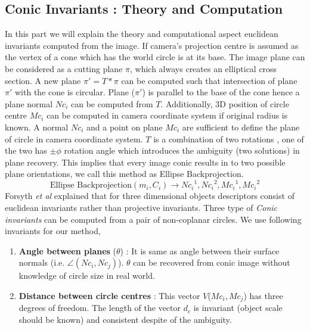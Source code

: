 \documentclass{bmvc2k}
\def\etal{\emph{et al}\bmvaOneDot}
\begin{document}
\subsection{Conic Invariants : Theory and Computation}
\label{subSec:ConicInv}
In this part we will explain the theory and computational aspect euclidean invariants computed from the image.  
If camera's projection centre is assumed as the vertex of a cone which has the world circle is at its base.
The image plane can be considered as a cutting plane $\pi$, which always creates an elliptical cross section.  
A new plane $ \pi' = T* \pi $ can be computed such that intersection of plane $\pi'$ with the cone is circular. 
Plane ($\pi'$) is parallel to the base of the cone hence a plane normal $Nc_i$ can be computed from $T$. 
Additionally, 3D position of circle centre $Mc_i$ can be computed in camera coordinate system if original radius is known.
A normal $Nc_i$ and a point on plane $Mc_i$ are sufficient to define the plane of circle in camera coordinate system.
$ T $ is a combination of two rotations \cite{forsyth_91}\cite{lo_pez_de_ipin_a_trip:_2002}, one of the two has $\pm \phi$ rotation angle which introduces the ambiguity (two solutions) in plane recovery. 
This implies that every image conic results in to two possible plane orientations, we call this method as Ellipse Backprojection. 
\begin{equation}
\text{Ellipse Backprojection}(m_i,C_i) \rightarrow {Nc_i}^1,{Nc_i}^2,{Mc_i}^1,{Mc_i}^2
\end{equation}
Forsyth \etal \cite{forsyth_91} explained that for three dimensional objects descriptors consist of euclidean invariants rather than projective invariants. Three type of \textit{Conic invariants} can be computed from a pair of non-coplanar circles.
We use following invariants for our method, 
\begin{enumerate}
	\item \textbf{Angle between planes} ($\theta$) : It is same as angle between their surface normals 
	(i.e. $ \angle(Nc_i,Nc_j) $). $\theta$ can be recovered from conic image without knowledge of circle size in real world.  
	\item \textbf{Distance between circle centres} : This vector $ V $($ Mc_i,Mc_j $) has three degrees of freedom. The length of the vector $d_c$ is invariant (object scale should be known) and consistent despite of the ambiguity. 
\end{enumerate}
\end{document}
